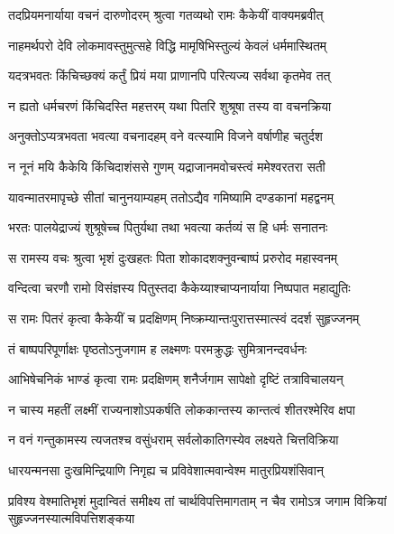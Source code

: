 \twolineshloka
{तदप्रियमनार्याया वचनं दारुणोदरम्}
{श्रुत्वा गतव्यथो रामः कैकेयीं वाक्यमब्रवीत्} %

\twolineshloka
{नाहमर्थपरो देवि लोकमावस्तुमुत्सहे}
{विद्धि मामृषिभिस्तुल्यं केवलं धर्ममास्थितम्} %

\twolineshloka
{यदत्रभवतः किंचिच्छक्यं कर्तुं प्रियं मया}
{प्राणानपि परित्यज्य सर्वथा कृतमेव तत्} %

\twolineshloka
{न ह्यतो धर्मचरणं किंचिदस्ति महत्तरम्}
{यथा पितरि शुश्रूषा तस्य वा वचनक्रिया} %

\twolineshloka
{अनुक्तोऽप्यत्रभवता भवत्या वचनादहम्}
{वने वत्स्यामि विजने वर्षाणीह चतुर्दश} %

\twolineshloka
{न नूनं मयि कैकेयि किंचिदाशंससे गुणम्}
{यद्राजानमवोचस्त्वं ममेश्वरतरा सती} %

\twolineshloka
{यावन्मातरमापृच्छे सीतां चानुनयाम्यहम्}
{ततोऽद्यैव गमिष्यामि दण्डकानां महद्वनम्} %

\twolineshloka
{भरतः पालयेद्राज्यं शुश्रूषेच्च पितुर्यथा}
{तथा भवत्या कर्तव्यं स हि धर्मः सनातनः} %

\twolineshloka
{स रामस्य वचः श्रुत्वा भृशं दुःखहतः पिता}
{शोकादशक्नुवन्बाष्पं प्ररुरोद महास्वनम्} %

\twolineshloka
{वन्दित्वा चरणौ रामो विसंज्ञस्य पितुस्तदा}
{कैकेय्याश्चाप्यनार्याया निष्पपात महाद्युतिः} %

\twolineshloka
{स रामः पितरं कृत्वा कैकेयीं च प्रदक्षिणम्}
{निष्क्रम्यान्तःपुरात्तस्मात्स्वं ददर्श सुहृज्जनम्} %

\twolineshloka
{तं बाष्पपरिपूर्णाक्षः पृष्ठतोऽनुजगाम ह}
{लक्ष्मणः परमक्रुद्धः सुमित्रानन्दवर्धनः} %

\twolineshloka
{आभिषेचनिकं भाण्डं कृत्वा रामः प्रदक्षिणम्}
{शनैर्जगाम सापेक्षो दृष्टिं तत्राविचालयन्} %

\twolineshloka
{न चास्य महतीं लक्ष्मीं राज्यनाशोऽपकर्षति}
{लोककान्तस्य कान्तत्वं शीतरश्मेरिव क्षपा} %

\twolineshloka
{न वनं गन्तुकामस्य त्यजतश्च वसुंधराम्}
{सर्वलोकातिगस्येव लक्ष्यते चित्तविक्रिया} %

\twolineshloka
{धारयन्मनसा दुःखमिन्द्रियाणि निगृह्य च}
{प्रविवेशात्मवान्वेश्म मातुरप्रियशंसिवान्} %

\fourlineindentedshloka
{प्रविश्य वेश्मातिभृशं मुदान्वितं}
{ समीक्ष्य तां चार्थविपत्तिमागताम्}
{न चैव रामोऽत्र जगाम विक्रियां}
{ सुहृज्जनस्यात्मविपत्तिशङ्कया} %


